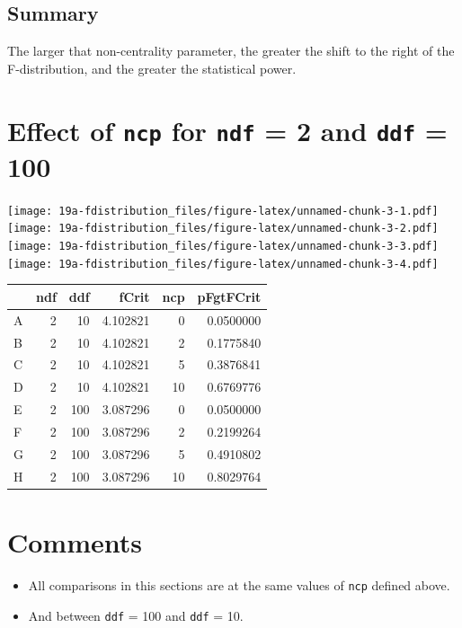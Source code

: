 \documentclass[
]{book}
\providecommand{\tightlist}{%
  \setlength{\itemsep}{0pt}\setlength{\parskip}{0pt}}
\begin{document}
\hypertarget{summary}{%
\subsection{Summary}\label{summary}}

The larger that non-centrality parameter, the greater the shift to the right of the F-distribution, and the greater the statistical power.

\hypertarget{effect-of-ncp-for-ndf-2-and-ddf-100}{%
\section{\texorpdfstring{Effect of \texttt{ncp} for \texttt{ndf} = 2 and \texttt{ddf} = 100}{Effect of ncp for ndf = 2 and ddf = 100}}\label{effect-of-ncp-for-ndf-2-and-ddf-100}}

\texttt{[image: 19a-fdistribution\_files/figure-latex/unnamed-chunk-3-1.pdf]} \texttt{[image: 19a-fdistribution\_files/figure-latex/unnamed-chunk-3-2.pdf]} \texttt{[image: 19a-fdistribution\_files/figure-latex/unnamed-chunk-3-3.pdf]} \texttt{[image: 19a-fdistribution\_files/figure-latex/unnamed-chunk-3-4.pdf]}

\begin{tabular}{l|r|r|r|r|r}
\hline
  & ndf & ddf & fCrit & ncp & pFgtFCrit\\
\hline
A & 2 & 10 & 4.102821 & 0 & 0.0500000\\
\hline
B & 2 & 10 & 4.102821 & 2 & 0.1775840\\
\hline
C & 2 & 10 & 4.102821 & 5 & 0.3876841\\
\hline
D & 2 & 10 & 4.102821 & 10 & 0.6769776\\
\hline
E & 2 & 100 & 3.087296 & 0 & 0.0500000\\
\hline
F & 2 & 100 & 3.087296 & 2 & 0.2199264\\
\hline
G & 2 & 100 & 3.087296 & 5 & 0.4910802\\
\hline
H & 2 & 100 & 3.087296 & 10 & 0.8029764\\
\hline
\end{tabular}

\hypertarget{comments-1}{%
\section{Comments}\label{comments-1}}

\begin{itemize}
\tightlist
\item
  All comparisons in this sections are at the same values of \texttt{ncp} defined above.
\item
  And between \texttt{ddf} = 100 and \texttt{ddf} = 10.
\end{itemize}
\end{document}
